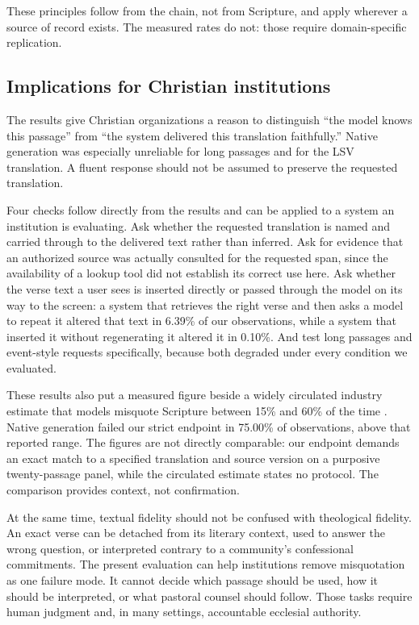 \documentclass[11pt]{article}
\begin{document}
These principles follow from the chain, not from Scripture, and apply wherever
a source of record exists. The measured rates do not: those require
domain-specific replication.

\subsection{Implications for Christian institutions}

The results give Christian organizations a reason to distinguish ``the model
knows this passage'' from ``the system delivered this translation faithfully.''
Native generation was especially unreliable for long passages and for the LSV
translation. A fluent response should not be assumed to preserve the requested
translation.

Four checks follow directly from the results and can be applied to a system an
institution is evaluating. Ask whether the requested translation is named and
carried through to the delivered text rather than inferred. Ask for evidence
that an authorized source was actually consulted for the requested span, since
the availability of a lookup tool did not establish its correct use here. Ask
whether the verse text a user sees is inserted directly or passed through the
model on its way to the screen: a system that retrieves the right verse and
then asks a model to repeat it altered that text in 6.39\% of our observations,
while a system that inserted it without regenerating it altered it in 0.10\%.
And test long passages and event-style requests specifically, because both
degraded under every condition we evaluated.

These results also put a measured figure beside a widely circulated industry
estimate that models misquote Scripture between 15\% and 60\% of the time
\citep{gruenewald2026misquotes}. Native generation failed our strict endpoint
in 75.00\% of observations, above that reported range. The figures are not
directly comparable: our endpoint demands an exact match to a specified
translation and source version
on a purposive twenty-passage panel, while the circulated estimate states no
protocol. The comparison provides context, not confirmation.

At the same time, textual fidelity should not be confused with theological
fidelity. An exact verse can be detached from its literary context, used to
answer the wrong question, or interpreted contrary to a community's
confessional commitments. The present evaluation can help institutions remove
misquotation as one failure mode. It cannot decide which passage should be
used, how it should be interpreted, or what pastoral counsel should follow.
Those tasks require human judgment and, in many settings, accountable ecclesial
authority.
\end{document}
